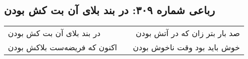 \begin{center}
\section*{رباعی شماره ۳۰۹: در بند بلای آن بت کش بودن}
\label{sec:sh309}
\begin{longtable}{l p{0.5cm} r}
در بند بلای آن بت کش بودن
&&
صد بار بتر زان که در آتش بودن
\\
اکنون که فریضه‌ست بلاکش بودن
&&
خوش باید بود وقت ناخوش بودن
\\
\end{longtable}
\end{center}
